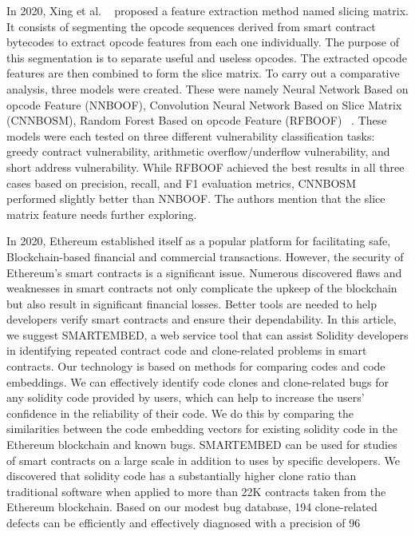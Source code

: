 In 2020, Xing et al. ~\cite{xing2020new} proposed a feature extraction method named slicing matrix.
It consists of segmenting the opcode sequences derived from
smart contract bytecodes to extract opcode features from each one individually.
The purpose of this segmentation is to separate useful and useless opcodes.
The extracted opcode features are then combined to form the slice matrix.
To carry out a comparative analysis, three models were created.
These were namely Neural Network Based on opcode Feature (NNBOOF), Convolution Neural Network Based on Slice Matrix (CNNBOSM), Random Forest Based on opcode Feature
(RFBOOF) ~\cite{hu2021comprehensive}.
These models were each tested on three different vulnerability classification tasks: greedy contract vulnerability, arithmetic overflow/underflow vulnerability, and short address vulnerability.
While RFBOOF achieved the best results in all three cases based on precision, recall, and F1 evaluation metrics, CNNBOSM performed slightly better than NNBOOF.
The authors mention that the slice matrix feature needs further exploring.

In 2020, Ethereum established itself as a popular platform for facilitating safe, Blockchain-based financial and commercial transactions.
However, the security of Ethereum's smart contracts is a significant issue.
Numerous discovered flaws and weaknesses in smart contracts not only complicate the upkeep of the blockchain but also result in significant financial losses. Better tools are needed to help developers verify smart contracts and ensure their dependability.
In this article, we suggest SMARTEMBED, a web service tool that can assist Solidity developers in identifying repeated contract code and clone-related problems in smart contracts.
Our technology is based on methods for comparing codes and code embeddings.
We can effectively identify code clones and clone-related bugs for any solidity code provided by users, which can help to increase the users' confidence in the reliability of their code. We do this by comparing the similarities between the code embedding vectors for existing solidity code in the Ethereum blockchain and known bugs.
SMARTEMBED can be used for studies of smart contracts on a large scale in addition to uses by specific developers.
We discovered that solidity code has a substantially higher clone ratio than traditional software when applied to more than 22K contracts taken from the Ethereum blockchain. Based on our modest bug database, 194 clone-related defects can be efficiently and effectively diagnosed with a precision of 96%


